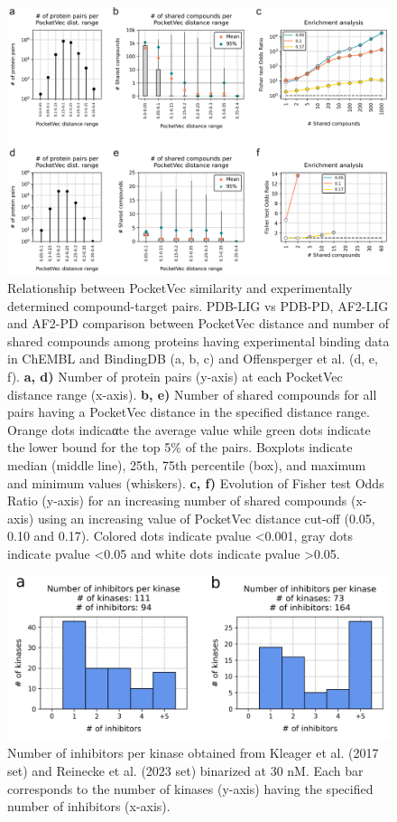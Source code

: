 \begin{figure}[htbp]
  \centering
  \includegraphics[width=1\linewidth]{figures/PocketVec/Supplementary/FigS28.png} 
  \caption{
  Relationship between PocketVec similarity and experimentally determined compound-target pairs. PDB-LIG vs PDB-PD, AF2-LIG and AF2-PD comparison between PocketVec distance and number of shared compounds among proteins having experimental binding data in ChEMBL and BindingDB (a, b, c) and Offensperger et al.\cite{offensperger_large-scale_2024} (d, e, f).
  \textbf{a, d)} Number of protein pairs (y-axis) at each PocketVec distance range (x-axis).
  \textbf{b, e)} Number of shared compounds for all pairs having a PocketVec distance in the specified distance range. Orange dots indicaαte the average value while green dots indicate the lower bound for the top 5\% of the pairs. Boxplots indicate median (middle line), 25th, 75th percentile (box), and maximum and minimum values (whiskers).
  \textbf{c, f)} Evolution of Fisher test Odds Ratio (y-axis) for an increasing number of shared compounds (x-axis) using an increasing value of PocketVec distance cut-off (0.05, 0.10 and 0.17). Colored dots indicate pvalue <0.001, gray dots indicate pvalue <0.05 and white dots indicate pvalue >0.05.
  }
  \label{PocketVec_FigS28}
\end{figure}


\begin{figure}[htbp]
  \centering
  \includegraphics[width=0.9\linewidth]{figures/PocketVec/Supplementary/FigS29.png}
  \caption{
  Number of inhibitors per kinase obtained from Kleager et al. (2017 set)\cite{klaeger_target_2017} and Reinecke et al. (2023 set)\cite{reinecke_chemical_2023} binarized at 30 nM. Each bar corresponds to the number of kinases (y-axis) having the specified number of inhibitors (x-axis). 
  }
  \label{PocketVec_FigS29}
\end{figure}


